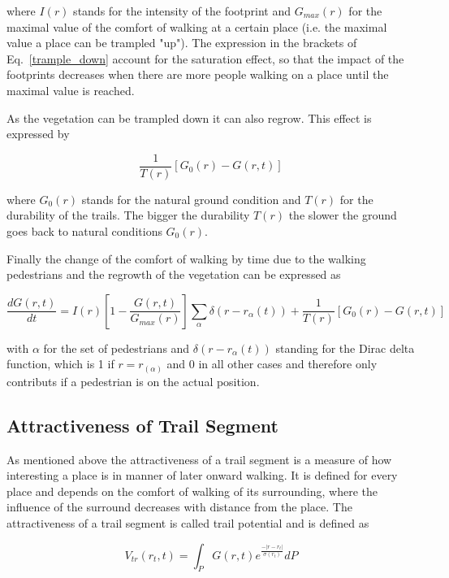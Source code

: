 where $I(r)$ stands for the intensity of the footprint and $G_{max}(r)$ for the maximal value of the comfort of walking at a certain place (i.e. the maximal value a place can be trampled "up"). The expression in the brackets of Eq.\ \ref{trample_down} account for the saturation effect, so that the impact of the footprints decreases when there are more people walking on a place until the maximal value is reached.

As the vegetation can be trampled down it can also regrow. This effect is expressed by

\begin{equation}
\frac{1}{T(r)}[G_0(r)-G(r,t)]
\end{equation}

where $G_0(r)$ stands for the natural ground condition and $T(r)$ for the durability of the trails. The bigger the durability $T(r)$ the slower the ground goes back to natural conditions $G_0(r)$.

Finally the change of the comfort of walking by time due to the walking pedestrians and the regrowth of the vegetation can be expressed as

\begin{equation}
\frac{dG(r,t)}{dt}=I(r)[1-\frac{G(r,t)}{G_{max}(r)}]\sum\limits_{\alpha} \delta(r-r_{\alpha}(t)) +\frac{1}{T(r)}[G_0(r)-G(r,t)]
\end{equation}

with $\alpha$ for the set of pedestrians and $\delta(r-r_{\alpha}(t))$ standing for the Dirac delta function, which is 1 if $r=r_(\alpha)$ and 0 in all other cases and therefore only contributs if a pedestrian is on the actual position.

\subsection{Attractiveness of Trail Segment}
\label{trail_potential}

As mentioned above the attractiveness of a trail segment is a measure of how interesting a place is in manner of later onward walking. It is defined for every place and depends on the comfort of walking of its surrounding, where the influence of the surround decreases with distance from the place. The attractiveness of a trail segment is called trail potential and is defined as

\begin{equation}
V_{tr}(r_t,t) = \int_{P} G(r,t) e^{\frac{-|r-r_t|}{\sigma(r_t)}} dP
\end{equation}

